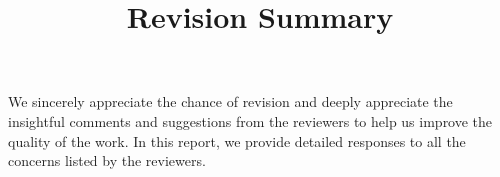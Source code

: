 \documentclass[11pt]{article}
\begin{document}
\title{Revision Summary}
\date{}
\maketitle


\noindent We sincerely appreciate the chance of revision and deeply appreciate the insightful comments and suggestions from the reviewers to help us improve the quality of the work. In this report, we provide detailed responses to all the concerns listed by the reviewers.







%


\end{document}
